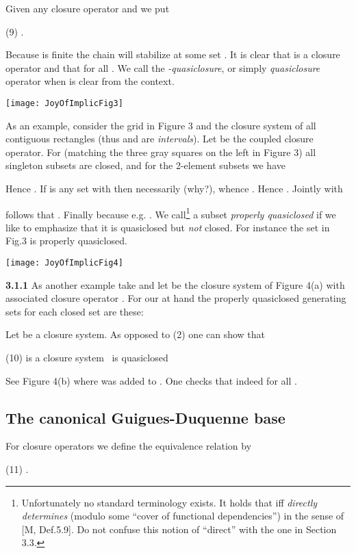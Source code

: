 \documentclass[11pt]{article}
\begin{document}
Given any closure operator  and  we put 

(9) \quad .

Because  is finite the chain  will stabilize at some set . It is clear that  is  a closure operator and that  for all . We call  the {\it -quasiclosure}, or simply {\it quasiclosure} operator when  is clear from the context.


\texttt{[image: JoyOfImplicFig3]}


As an example, consider the  grid  in Figure 3 and the closure system  of all contiguous rectangles  (thus  and  are {\it intervals}). Let  be the coupled closure operator. For  (matching the three gray squares on the left in Figure 3) all singleton subsets are closed, and for the 2-element subsets we have

Hence . If  is any set with  then necessarily  (why?), whence . Hence . Jointly with 

follows that . Finally  because e.g. .
We call\footnote{Unfortunately no standard terminology exists. It holds that  iff  {\it directly determines}  (modulo some ``cover of functional dependencies'') in the sense of [M, Def.5.9]. Do not confuse this notion of ``direct'' with the one in Section 3.3.} a subset {\it properly quasiclosed} if we like to emphasize that it is quasiclosed but {\it not} closed.
For instance the set  in Fig.3 is properly quasiclosed. 


\texttt{[image: JoyOfImplicFig4]}


{\bf 3.1.1} As another example take  and let  be the closure system of Figure 4(a) with associated closure operator . For our  at hand the properly quasiclosed generating sets for each closed set are these:



Let  be a closure system. As opposed to (2) one can show that

(10) \quad  is a closure system \  is quasiclosed

See Figure 4(b) where  was added to . One checks that indeed  for all .





\subsection{The canonical Guigues-Duquenne base}


For closure operators  we define the equivalence relation  by

(11) \quad .
\end{document}
